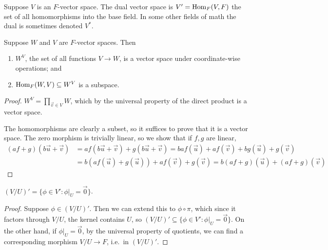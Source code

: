 \begin{definition}
    Suppose \(V\) is an \(F\)-vector space.
    The dual vector space is \(V' = \operatorname{Hom}_F(V,F)\)
    the set of all homomorphisms into the base field.
    In some other fields of math the dual is sometimes denoted \(V^\ast\).
\end{definition}
\begin{lemma}
    Suppose \(W\) and \(V\) are \(F\)-vector spaces. Then
    \begin{enumerate}[label={(\alph*)}, itemsep=0mm]
        \item \(W^V\), the set of all functions \(V \to W\),
            is a vector space under coordinate-wise operations; and
        \item \(\operatorname{Hom}_F(W,V) \subseteq W^V\) is a subspace.
    \end{enumerate}
\end{lemma}
\begin{proof}
    \(W^V = \prod_{\vec{v} \in V} W\),
    which by the universal property of the direct product is a vector space.

    The homomorphisms are clearly a subset,
    so it suffices to prove that it is a vector space.
    The zero morphism is trivially linear,
    so we show that if \(f,g\) are linear,
    \begin{align*}
        (af+g)(b\vec{u}+\vec{v}) &= af(b\vec{u}+\vec{v}) + g(b\vec{u}+\vec{v})
        = baf(\vec{u}) + af(\vec{v}) + bg(\vec{u}) + g(\vec{v}) \\
        &= b(af(\vec{u}) + g(\vec{u})) + af(\vec{v}) + g(\vec{v})
        = b(af+g)(\vec{u}) + (af+g)(\vec{v})
    \end{align*}
\end{proof}
\begin{proposition}
    \({(V/U)}' = \{\phi \in V' : \phi\vert_U = \vec{0}\}\).
\end{proposition}
\begin{proof}
    Suppose \(\phi \in {(V/U)}'\).
    Then we can extend this to \(\phi\circ\pi\),
    which since it factors through \(V/U\),
    the kernel contains \(U\),
    so \({(V/U)}' \subseteq \{\phi \in V' : \phi\vert_U = \vec{0}\}\).
    On the other hand, if \(\phi\vert_U = \vec{0}\),
    by the universal property of quotients,
    we can find a corresponding morphism \(V/U \to F\),
    i.e.\ in \({(V/U)}'\).
\end{proof}

